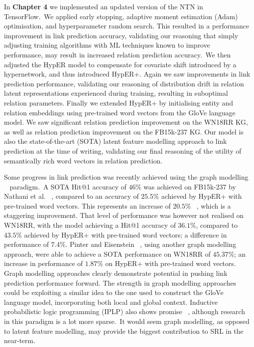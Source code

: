 \noindent In \textbf{Chapter 4} we implemented an updated version of the NTN in TensorFlow.\ We applied early stopping, adaptive moment estimation (Adam) optimisation, and hyperparameter random search. This resulted in a performance improvement in link prediction accuracy, validating our reasoning that simply adjusting training algorithms with ML techniques known to improve performance, may result in increased relation prediction accuracy.\ We then adjusted the HypER model to compensate for covariate shift introduced by a hypernetwork, and thus introduced HypER+. Again we saw improvements in link prediction performance, validating our reasoning of distribution drift in relation latent representations experienced during training, resulting in suboptimal relation parameters. Finally we extended HypER+ by initialising entity and relation embeddings using pre-trained word vectors from the GloVe language model. We saw significant relation prediction improvement on the WN18RR KG, as well as relation prediction improvement on the FB15k-237 KG. Our model is also the state-of-the-art (SOTA) latent feature modelling approach to link prediction at the time of writing, validating our final reasoning of the utility of semantically rich word vectors in relation prediction. \par

\noindent Some progress in link prediction was recently achieved using the graph modelling \unskip ~\citep{Nickel_2016} paradigm.\ A SOTA Hit@1 accuracy of $ 46\% $ was achieved on FB15k-237 by Nathani et al. \unskip ~\citep{nathani2019learning}, compared to an accuracy of $ 25.5\% $ achieved by HypER+ with pre-trained word vectors. This represents an increase of $ 20.5 \% $ \unskip ~\citep{ruderNLPProg}, which is a staggering improvement. That level of performance was however not realised on WN18RR, with the model achieving a Hit@1 accuracy of $ 36.1\% $, compared to $ 43.5 \% $ achieved by HypER+ with pre-trained word vectors; a difference in performance of $ 7.4\% $. Pinter and Eisenstein \unskip ~\citep{pinter-eisenstein-2018-predicting}, using another graph modelling approach, were able to achieve a SOTA performance on WN18RR of $ 45.37\% $; an increase in performance of $ 1.87\% $ on HypER+ with pre-trained word vectors. Graph modelling approaches clearly demonstrate potential in pushing link prediction performance forward. The strength in graph modelling approaches could be exploiting a similar idea to the one used to construct the GloVe \unskip ~\citep{pennington2014glove} language model, incorporating both local and global context. Inductive probabilistic logic programming (IPLP) also shows promise \unskip ~\citep{dong2019neural, manhaeve2018deepproblog}, although research in this paradigm is a lot more sparse.\ It would seem graph modelling, as opposed to latent feature modelling, may provide the biggest contribution to SRL in the near-term. 
